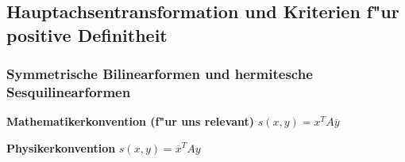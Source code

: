 \documentclass[8pt, a4paper, twocolumn, landscape]{article}
\begin{document}
\subsection{Hauptachsentransformation und Kriterien f"ur positive Definitheit}

\subsubsection{Symmetrische Bilinearformen und hermitesche Sesquilinearformen}


\begin{remark}


\textbf{Mathematikerkonvention (f"ur uns relevant)} $s(x, y) = x^T A \overline{y}$

\textbf{Physikerkonvention} $s(x, y) = \overline{x}^T A y$

\end{remark}
\end{document}
